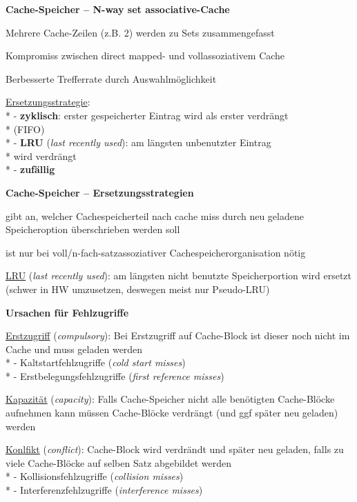\textbf{Cache-Speicher -- N-way set associative-Cache}
\begin{items}
	\item Mehrere Cache-Zeilen (z.B. 2) werden zu Sets zusammengefasst
	\item Kompromiss zwischen direct mapped- und vollassoziativem Cache
	\item Berbesserte Trefferrate durch Auswahlmöglichkeit
	\item \underline{Ersetzungsstrategie}: \\*
		- \textbf{zyklisch}: erster gespeicherter Eintrag wird als erster verdrängt \\* \phantom{-} (FIFO) \\*
		- \textbf{LRU} (\emph{last recently used}): am längsten unbenutzter Eintrag \\* \phantom{-} wird verdrängt \\*
		- \textbf{zufällig}
\end{items}

\textbf{Cache-Speicher -- Ersetzungsstrategien}
\begin{items}
	\item gibt an, welcher Cachespeicherteil nach cache miss durch neu geladene Speicheroption überschrieben werden soll
	\item ist nur bei voll/n-fach-satzassoziativer Cachespeicherorganisation nötig
	\item \underline{LRU} (\emph{last recently used}): am längsten nicht benutzte Speicherportion wird ersetzt (schwer in HW umzusetzen, deswegen meist nur Pseudo-LRU)
\end{items}

\textbf{Ursachen für Fehlzugriffe}
\begin{items}
	\item \underline{Erstzugriff} (\emph{compulsory}): Bei Erstzugriff auf Cache-Block ist dieser noch nicht im Cache und muss geladen werden \\*
	- Kaltstartfehlzugriffe (\emph{cold start misses}) \\*
	- Erstbelegungsfehlzugriffe (\emph{first reference misses})
	\item \underline{Kapazität} (\emph{capacity}): Falls Cache-Speicher nicht alle benötigten Cache-Blöcke aufnehmen kann müssen Cache-Blöcke verdrängt (und ggf später neu geladen) werden
	\item \underline{Konlfikt} (\emph{conflict}): Cache-Block wird verdrändt und später neu geladen, falls zu viele Cache-Blöcke auf selben Satz abgebildet werden \\*
	- Kollisionsfehlzugriffe (\emph{collision misses}) \\*
	- Interferenzfehlzugriffe (\emph{interference misses})
\end{items}

